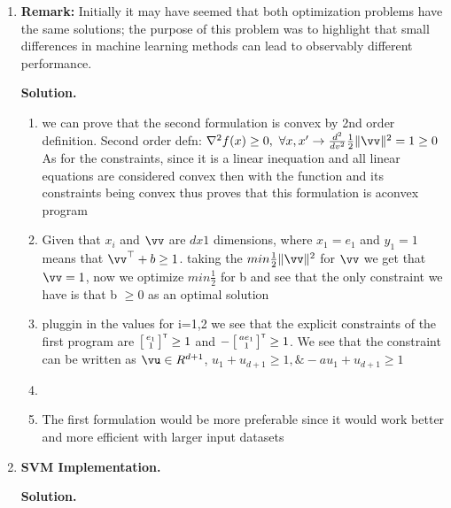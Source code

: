 \documentclass{article}
\newcommand\T{{\scriptscriptstyle\mathsf{T}}}
\def\1{\mathds{1}}
\theoremstyle{definition}
\theoremstyle{remark}
\newenvironment{Q}
{%
\clearpage
\item
}
{%
\phantom{s}%
\bigskip%
\noindent\textbf{Solution.}
}
\begin{document}
\begin{enumerate}[font={\Large\bfseries},left=0pt]
\begin{Q}
\begin{enumerate}
      \textbf{Remark:} Initially it may have seemed that both optimization problems have
      the same solutions; the purpose of this problem was to highlight that small differences
      in machine learning methods can lead to observably different performance.
  \end{enumerate}
\end{Q}
\begin{enumerate}
  \item we can prove that the second formulation is convex by 2nd order definition.
  Second order defn: $\nabla^2 f(x) \geq 0,\text{ } \forall x, x' 
  \rightarrow \frac{d^2}{dv^2} \frac{1}{2} \|\vv\|^2 = 1 \geq 0$\\
  As for the constraints, since it is a linear inequation and all linear
  equations are considered convex then with the function and its constraints being
  convex thus proves that this formulation is aconvex program
  \item Given that $x_i$ and $\vv$ are $d x 1$ dimensions, where $x_1=e_1$
  and $y_1=1$ means that $\vv^\top+b \geq 1$. taking the $min \frac{1}{2}\|\vv\|^2$
  for $\vv$ we get that $\vv=1$, now we optimize $min \frac{1}{2}$ for b and see that the
  only constraint we have is that b $\geq 0$ as an optimal solution
  \item pluggin in the values for i=1,2 we see that the explicit constraints of the first program
  are $\sbr[1]{\begin{smallmatrix}e_1\\1\end{smallmatrix}}^\T \geq 1$ and 
  $-\sbr[1]{\begin{smallmatrix}ae_1\\1\end{smallmatrix}}^\T \geq 1$. We see that the constraint can be written as
  $\vu \in R^{d+1}$, $ u_1 + u_{d+1} \geq 1, \& -au_1 + u_{d+1} \geq 1$
  \item 
  \item The first formulation would be more preferable since it would work
  better and more efficient with larger input datasets
\end{enumerate}
  
\begin{Q}
    \textbf{\Large SVM Implementation.}
    

\end{Q}
\end{enumerate}
\end{document}
